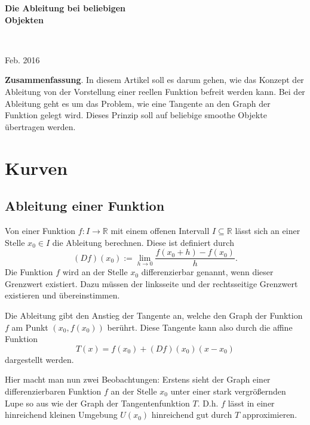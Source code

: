 \documentclass[a4paper,12pt,fleqn]{article}
\begin{document}
\begin{center}
\begin{LARGE}
\noindent
\textbf{Die Ableitung bei beliebigen\\
Objekten}
\end{LARGE}
\\
\vspace{2mm}
\begin{large}
Feb. 2016
\end{large}
\end{center}

\tableofcontents
\vspace{4mm}
\noindent
\textbf{Zusammenfassung}. In diesem Artikel soll es darum gehen,
wie das Konzept der Ableitung von der Vorstellung einer reellen
Funktion befreit werden kann. Bei der Ableitung geht es um das
Problem, wie eine Tangente an den Graph der Funktion gelegt wird.
Dieses Prinzip soll auf beliebige {\glqq}smoothe{\grqq} Objekte
übertragen werden.

\newpage
\section{Kurven}
\subsection{Ableitung einer Funktion}

Von einer Funktion $f\colon I\to\mathbb R$ mit einem
offenen Intervall $I\subseteq\mathbb R$ lässt sich an einer
Stelle $x_0\in I$ die Ableitung berechnen. Diese ist definiert
durch
\begin{equation}\label{eq:Differentialquotient}
(Df)(x_0) := \lim_{h\rightarrow 0} \frac{f(x_0+h)-f(x_0)}{h}.
\end{equation}
Die Funktion $f$ wird an der Stelle $x_0$ differenzierbar genannt,
wenn dieser Grenzwert existiert. Dazu müssen der linksseite und
der rechtsseitige Grenzwert existieren und übereinstimmen.

Die Ableitung gibt den Anstieg der Tangente an, welche den Graph
der Funktion $f$ am Punkt $(x_0,f(x_0))$ berührt. Diese
Tangente kann also durch die affine Funktion
\begin{equation}
T(x) = f(x_0)+(Df)(x_0)(x-x_0)
\end{equation}
dargestellt werden.

Hier macht man nun zwei Beobachtungen: Erstens sieht der Graph einer
differenzierbaren Funktion $f$ an der Stelle $x_0$ unter einer
stark vergrößernden Lupe so aus wie der Graph der Tangentenfunktion
$T$. D.h. $f$ lässt in einer hinreichend kleinen
Umgebung $U(x_0)$ hinreichend gut durch $T$ approximieren.
\end{document}
